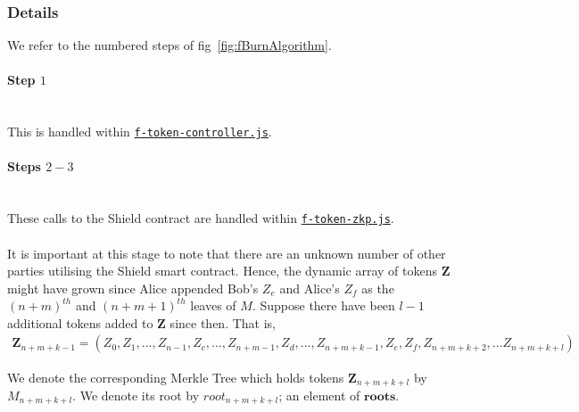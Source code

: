 \documentclass{article}
\begin{document}
\newpage
\subsubsection{Details}
\label{sec:20BurnDetails}

We refer to the numbered steps of fig~\ref{fig:fBurnAlgorithm}.

\paragraph{Step $1$}
\ \\
This is handled within \hyperref[sec:f-token-controller]{\texttt{f-token-controller.js}}.

\paragraph{Steps $2 - 3$}
\ \\
These calls to the Shield contract are handled within \hyperref[sec:f-token-zkp]{\texttt{f-token-zkp.js}}.\\
\\
\noindent
It is important at this stage to note that there are an unknown number of other parties utilising the Shield smart contract.
Hence, the dynamic array of tokens $\bm{Z}$ might have grown since Alice appended Bob's $Z_e$ and Alice's $Z_f$ as the $(n+m)^{th}$ and $(n+m+1)^{th}$ leaves of $M$.
Suppose there have been $l-1$ additional tokens added to $\bm{Z}$ since then.
That is,\\
\begin{align*}
  \bm{Z}_{n+m+k-1} = (Z_0, Z_1,...,Z_{n-1}, Z_c, ..., Z_{n+m-1}, Z_d,..., Z_{n+m+k-1}, Z_e, Z_f, Z_{n+m+k+2}, ... Z_{n+m+k+l})
\end{align*}

\noindent
We denote the corresponding Merkle Tree which holds tokens $\bm{Z}_{n+m+k+l}$ by $M_{n+m+k+l}$. We denote its root by $root_{n+m+k+l}$; an element of $\bm{roots}$.
\end{document}
